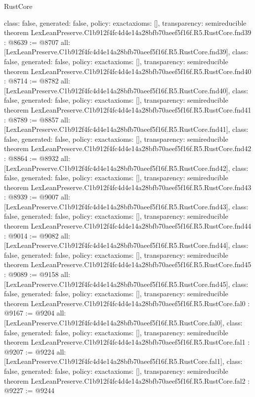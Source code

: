 \begin{lexlean}{RustCore}
\begin{coremodule}
{  class: false,
  generated: false,
  policy: exact{axioms: []},
  transparency: semireducible
}
theorem LexLeanPreserve.C1b912f4fc4d4e14a28bfb70aeef5f16f.R5.RustCore.fnd39 : @8639 := @8707 {
  all: [LexLeanPreserve.C1b912f4fc4d4e14a28bfb70aeef5f16f.R5.RustCore.fnd39],
  class: false,
  generated: false,
  policy: exact{axioms: []},
  transparency: semireducible
}
theorem LexLeanPreserve.C1b912f4fc4d4e14a28bfb70aeef5f16f.R5.RustCore.fnd40 : @8714 := @8782 {
  all: [LexLeanPreserve.C1b912f4fc4d4e14a28bfb70aeef5f16f.R5.RustCore.fnd40],
  class: false,
  generated: false,
  policy: exact{axioms: []},
  transparency: semireducible
}
theorem LexLeanPreserve.C1b912f4fc4d4e14a28bfb70aeef5f16f.R5.RustCore.fnd41 : @8789 := @8857 {
  all: [LexLeanPreserve.C1b912f4fc4d4e14a28bfb70aeef5f16f.R5.RustCore.fnd41],
  class: false,
  generated: false,
  policy: exact{axioms: []},
  transparency: semireducible
}
theorem LexLeanPreserve.C1b912f4fc4d4e14a28bfb70aeef5f16f.R5.RustCore.fnd42 : @8864 := @8932 {
  all: [LexLeanPreserve.C1b912f4fc4d4e14a28bfb70aeef5f16f.R5.RustCore.fnd42],
  class: false,
  generated: false,
  policy: exact{axioms: []},
  transparency: semireducible
}
theorem LexLeanPreserve.C1b912f4fc4d4e14a28bfb70aeef5f16f.R5.RustCore.fnd43 : @8939 := @9007 {
  all: [LexLeanPreserve.C1b912f4fc4d4e14a28bfb70aeef5f16f.R5.RustCore.fnd43],
  class: false,
  generated: false,
  policy: exact{axioms: []},
  transparency: semireducible
}
theorem LexLeanPreserve.C1b912f4fc4d4e14a28bfb70aeef5f16f.R5.RustCore.fnd44 : @9014 := @9082 {
  all: [LexLeanPreserve.C1b912f4fc4d4e14a28bfb70aeef5f16f.R5.RustCore.fnd44],
  class: false,
  generated: false,
  policy: exact{axioms: []},
  transparency: semireducible
}
theorem LexLeanPreserve.C1b912f4fc4d4e14a28bfb70aeef5f16f.R5.RustCore.fnd45 : @9089 := @9158 {
  all: [LexLeanPreserve.C1b912f4fc4d4e14a28bfb70aeef5f16f.R5.RustCore.fnd45],
  class: false,
  generated: false,
  policy: exact{axioms: []},
  transparency: semireducible
}
theorem LexLeanPreserve.C1b912f4fc4d4e14a28bfb70aeef5f16f.R5.RustCore.fal0 : @9167 := @9204 {
  all: [LexLeanPreserve.C1b912f4fc4d4e14a28bfb70aeef5f16f.R5.RustCore.fal0],
  class: false,
  generated: false,
  policy: exact{axioms: []},
  transparency: semireducible
}
theorem LexLeanPreserve.C1b912f4fc4d4e14a28bfb70aeef5f16f.R5.RustCore.fal1 : @9207 := @9224 {
  all: [LexLeanPreserve.C1b912f4fc4d4e14a28bfb70aeef5f16f.R5.RustCore.fal1],
  class: false,
  generated: false,
  policy: exact{axioms: []},
  transparency: semireducible
}
theorem LexLeanPreserve.C1b912f4fc4d4e14a28bfb70aeef5f16f.R5.RustCore.fal2 : @9227 := @9244 {
}
\end{coremodule}
\end{lexlean}

